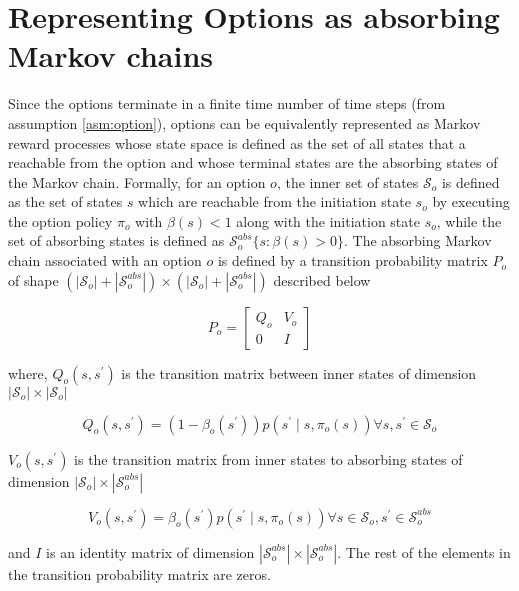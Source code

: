\section{Representing Options as absorbing Markov chains} \label{sec:trueP0}

Since the options terminate in a finite time number of time steps (from assumption \ref{asm:option}), options can be equivalently represented as Markov reward processes whose state space is defined as the set of all states that a reachable from the option and whose terminal states are the absorbing states of the Markov chain.
Formally, for an option $o$, the inner set of states $\mathcal{S}_o$ is defined as the set of states $s$ which are reachable from the initiation state $s_o$ by executing the option policy $\pi_o$ with $\beta(s) < 1$ along with the initiation state $s_o$, while the set of absorbing states is defined as $\mathcal{S}_o^{abs}\{s : \beta(s) > 0\}$.
The absorbing Markov chain associated with an option $o$ is defined by a transition probability matrix $P_o$ of shape $(|\mathcal{S}_o| + |\mathcal{S}_o^{abs}|) \times (|\mathcal{S}_o| + |\mathcal{S}_o^{abs}|)$ described below

\begin{equation}
    P_o = \begin{bmatrix}
       Q_o & V_o \\
       0 & I
    \end{bmatrix}
\end{equation}

where, $Q_o(s, s^\prime)$ is the transition matrix between inner states of dimension $|\mathcal{S}_o| \times |\mathcal{S}_o|$

\begin{equation}
    Q_o(s, s^\prime) = (1 - \beta_o(s^\prime)) p(s^\prime \mid s, \pi_o(s)) \forall s, s^\prime \in \mathcal{S}_o
\end{equation}

$V_o(s, s^\prime)$ is the transition matrix from inner states to absorbing states of dimension $|\mathcal{S}_o| \times |\mathcal{S}_o^{abs}|$

\begin{equation}
    V_o(s, s^\prime) = \beta_o(s^\prime) p(s^\prime \mid s, \pi_o(s)) \forall s \in \mathcal{S}_o, s^\prime \in \mathcal{S}_o^{abs}
\end{equation}

and $I$ is an identity matrix of dimension $|\mathcal{S}_o^{abs}| \times |\mathcal{S}_o^{abs}|$.
The rest of the elements in the transition probability matrix are zeros.

